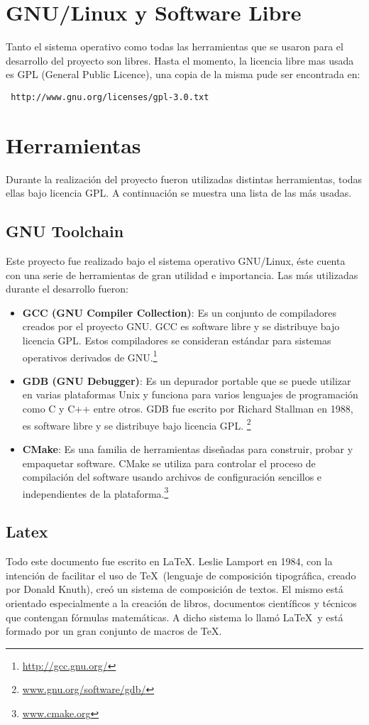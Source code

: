 \section{GNU/Linux y Software Libre}
Tanto el sistema operativo como todas las herramientas que se usaron para el desarrollo del proyecto son libres. Hasta el momento, la licencia libre mas usada es GPL (General Public Licence), una copia de la misma pude ser encontrada en: \begin{verbatim} http://www.gnu.org/licenses/gpl-3.0.txt \end{verbatim}
\section{Herramientas}
Durante la realizaci\'on del proyecto fueron utilizadas distintas herramientas, todas ellas bajo licencia GPL. A continuaci\'on se muestra una lista 
de las m\'as usadas.

\subsection{GNU Toolchain}
Este proyecto fue realizado bajo el sistema operativo GNU/Linux, \'este cuenta con una serie de herramientas de gran utilidad e importancia. Las m\'as
utilizadas durante el desarrollo fueron:
\begin{itemize}
  \item \textbf{GCC (GNU Compiler Collection)}: Es un conjunto de compiladores creados por el proyecto GNU. GCC es software libre y se distribuye bajo
    licencia GPL. Estos compiladores se consideran est\'andar para sistemas operativos derivados de GNU.\footnote{\url{http://gcc.gnu.org/}}
  \item \textbf{GDB (GNU Debugger)}: Es un depurador portable que se puede utilizar en varias plataformas Unix y funciona para varios lenguajes de
    programaci\'on como C y C++ entre otros. GDB fue escrito por Richard Stallman en 1988, es software libre y se distribuye bajo licencia GPL.
    \footnote{\url{www.gnu.org/software/gdb/}}
  \item \textbf{CMake}: Es una familia de herramientas dise\~nadas para construir, probar y empaquetar software. CMake se utiliza para controlar el
    proceso de compilaci\'on del software usando archivos de configuraci\'on sencillos e independientes de la plataforma.\footnote{\url{www.cmake.org}}
 \end{itemize}

\subsection{Latex}
Todo este documento fue escrito en \LaTeX. Leslie Lamport en 1984, con la intenci\'on de facilitar el uso de \TeX \ (lenguaje de composici\'on tipográfica,
creado por Donald Knuth), cre\'o un sistema de composici\'on de textos. El mismo est\'a orientado especialmente a la creaci\'on de libros, documentos
cient\'ificos y t\'ecnicos que contengan f\'ormulas matem\'aticas. A dicho sistema lo llam\'o \LaTeX \ y est\'a formado por un gran conjunto de macros de
\TeX.

